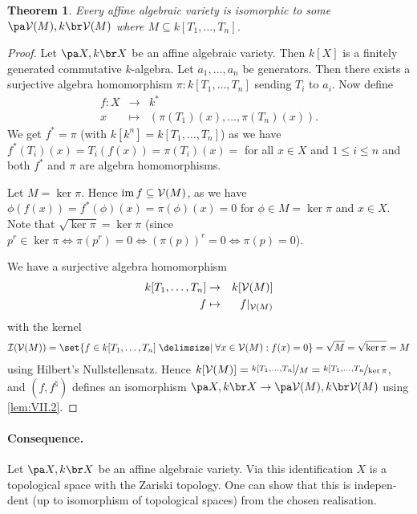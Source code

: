 \documentclass[12pt,a4paper]{scrartcl}
\theoremstyle{cplain}
\theoremstyle{cplain}
\newtheorem{thm}[thmcounter]{Theorem}
\theoremstyle{cplain}
\theoremstyle{definition}
\begin{document}
\begin{otherlanguage}{english}
\begin{thm}
  Every affine algebraic variety is isomorphic to some $\aav{\Vs(M)}$ where $M\subseteq k[T_1,\ldots,T_n]$.
\end{thm}
\begin{proof}
  Let $\aav X$ be an affine algebraic variety. Then $k[X]$ is a finitely generated commutative $k$-algebra. Let $a_1,\ldots,a_n$ be generators. Then there exists a surjective algebra homomorphism $\pi\colon k[T_1,\ldots,T_n]$ sending $T_i$ to $a_i$. Now define
  \begin{eqnarray*}
    f\colon X &\to& k^* \\
    x &\mapsto& (\pi(T_1)(x),\ldots,\pi(T_n)(x)).
  \end{eqnarray*}
  We get $f^* = \pi$ (with $k[k^n] = k[T_1,\ldots,T_n]$) as we have $f^*(T_i)(x) = T_i(f(x)) = \pi(T_i)(x) =$ for all $x\in X$ and $1\le i\le n$ and both $f^*$ and $\pi$ are algebra homomorphisms.

  Let $M = \ker\pi$. Hence $\operatorname{im} f \subseteq \mathcal{V}(M)$, as we have $\phi(f(x)) = f^*(\phi)(x) = \pi(\phi)(x) = 0$ for $\phi \in M = \ker\pi$ and $x \in X$. Note that $\sqrt{\ker\pi} = \ker\pi$ (since $p^r \in \ker\pi \Leftrightarrow \pi(p^r) = 0 \Leftrightarrow (\pi(p))^r = 0 \Leftrightarrow \pi(p) = 0$).

  We have a surjective algebra homomorphism
  \begin{eqnarray*}
    k[T_1,\ldots,T_n] &\to& k[\mathcal{V}(M)] \\
    f &\mapsto& f|_{\mathcal{V}(M)}
  \end{eqnarray*}
  with the kernel
  \begin{align*}
    \Is(\Vs(M)) = \set{f\in k[T_1,\ldots,T_n]\given \forall x \in \Vs(M): f(x) = 0} = \sqrt{M} = \sqrt{\ker\pi} = M
  \end{align*}
  using Hilbert's Nullstellensatz. Hence $k[\mathcal{V}(M)] = \nicefrac{k[T_1,\ldots,T_n]}{M} = \nicefrac{k[T_1,\ldots,T_n}{\operatorname{ker}\pi}$, and $(f,f^\natural)$ defines an isomorphism $\aav X \to \aav{\Vs(M)}$ using \cref{lem:VII.2}.
\end{proof}

\paragraph{Consequence.}
Let $\aav X$ be an affine algebraic variety. Via this identification $X$ is a topological space with the Zariski topology. One can show that this is independent (up to isomorphism of topological spaces) from the chosen realisation.


\end{otherlanguage}
\end{document}
